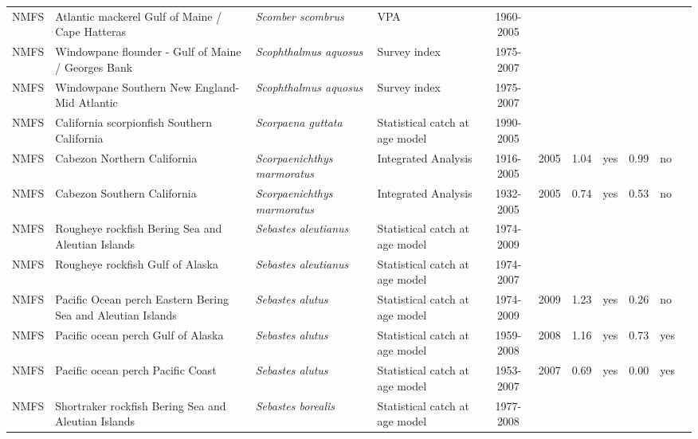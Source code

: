 \begin{longtable}{p{1.8cm}p{3.5cm}p{3.5cm}p{3cm}cccp{0.9cm}cp{0.9cm}c}
  NMFS & Atlantic mackerel Gulf of Maine / Cape Hatteras & \textit{Scomber scombrus} & VPA & 1960-2005 &  &  &  &  &  & \cite{AtlanticMackerel2005.pdf} \\ 
  NMFS & Windowpane flounder - Gulf of Maine / Georges Bank & \textit{Scophthalmus aquosus} & Survey index & 1975-2007 &  &  &  &  &  & \cite{garm3p.pdf} \\ 
  NMFS & Windowpane Southern New England-Mid Atlantic & \textit{Scophthalmus aquosus} & Survey index & 1975-2007 &  &  &  &  &  & \cite{http://www.nefsc.noaa.gov/nefsc/publications/crd/crd0815/crd0815.pdf} \\ 
  NMFS & California scorpionfish Southern California & \textit{Scorpaena guttata} & Statistical catch at age model & 1990-2005 &  &  &  &  &  & \cite{Scorpionfish_assessment_report_2005.pdf} \\ 
  NMFS & Cabezon Northern California & \textit{Scorpaenichthys marmoratus} & Integrated Analysis & 1916-2005 & 2005 & 1.04 & yes & 0.99 & no & \cite{2005-SAFE-WCcabezon.pdf} \\ 
  NMFS & Cabezon Southern California & \textit{Scorpaenichthys marmoratus} & Integrated Analysis & 1932-2005 & 2005 & 0.74 & yes & 0.53 & no & \cite{2005_SAFE_Wccabezon.pdf} \\ 
  NMFS & Rougheye rockfish Bering Sea and Aleutian Islands & \textit{Sebastes aleutianus} & Statistical catch at age model & 1974-2009 &  &  &  &  &  & \cite{2008 SAFE BSAIrougheye.pdf} \\ 
  NMFS & Rougheye rockfish Gulf of Alaska & \textit{Sebastes aleutianus} & Statistical catch at age model & 1974-2007 &  &  &  &  &  & \cite{AFSC-RYEROCKGA-2008-Rougheye rockfish GA.pdf} \\ 
  NMFS & Pacific Ocean perch Eastern Bering Sea and Aleutian Islands & \textit{Sebastes alutus} & Statistical catch at age model & 1974-2009 & 2009 & 1.23 & yes & 0.26 & no & \cite{2008_SAFE_BSAIpop.pdf} \\ 
  NMFS & Pacific ocean perch Gulf of Alaska & \textit{Sebastes alutus} & Statistical catch at age model & 1959-2008 & 2008 & 1.16 & yes & 0.73 & yes & \cite{AFSC-POPERCHGA-2008-Pacific ocean perch GA.pdf} \\ 
  NMFS & Pacific ocean perch Pacific Coast & \textit{Sebastes alutus} & Statistical catch at age model & 1953-2007 & 2007 & 0.69 & yes & 0.00 & yes & \cite{NWFSC-POPERCHPCOAST-2007-Pacific ocean perch.pdf} \\ 
  NMFS & Shortraker rockfish Bering Sea and Aleutian Islands & \textit{Sebastes borealis} & Statistical catch at age model & 1977-2008 &  &  &  &  &  & \cite{2008_SAFE_BSAIshortraker.pdf} \\ 

\end{longtable}
